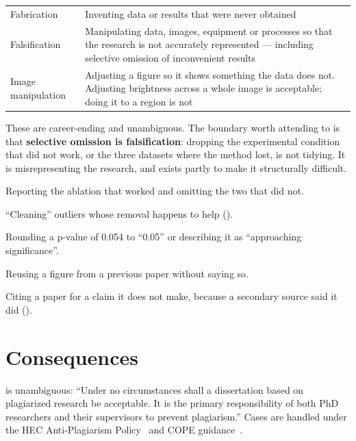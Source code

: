 \begin{center}
\small
\begin{tabular}{@{}L{3.0cm}L{11.3cm}@{}}
\toprule
Fabrication   & Inventing data or results that were never obtained \\
Falsification & Manipulating data, images, equipment or processes so that the
                research is not accurately represented --- including selective
                omission of inconvenient results \\
Image manipulation & Adjusting a figure so it shows something the data does
                not. Adjusting brightness across a whole image is acceptable;
                doing it to a region is not \\
\bottomrule
\end{tabular}
\end{center}

These are career-ending and unambiguous. The boundary worth attending to is
that \textbf{selective omission is falsification}: dropping the experimental
condition that did not work, or the three datasets where the method lost, is
not tidying. It is misrepresenting the research, and  exists
partly to make it structurally difficult.

\begin{pitfall}
\begin{tight}
  \item Reporting the ablation that worked and omitting the two that did not.
  \item ``Cleaning'' outliers whose removal happens to help ().
  \item Rounding a p-value of 0.054 to ``0.05'' or describing it as
    ``approaching significance''.
  \item Reusing a figure from a previous paper without saying so.
  \item Citing a paper for a claim it does not make, because a secondary source
    said it did ().
\end{tight}
\end{pitfall}

\section{Consequences}

 is unambiguous: ``Under no circumstances shall a
dissertation based on plagiarized research be acceptable. It is the primary
responsibility of both PhD researchers and their supervisors to prevent
plagiarism.'' Cases are handled under the HEC Anti-Plagiarism
Policy~\cite{hec2023plagiarism} and COPE guidance~\cite{cope2019corepractices}.

